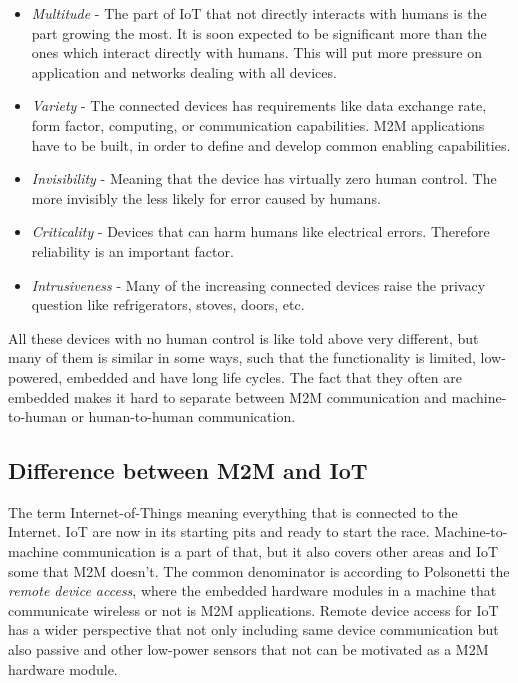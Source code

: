 \begin{itemize}
	\item \textit{Multitude} - The part of IoT that not directly interacts with humans is the part growing the most. It is soon expected to be significant more than the ones which interact directly with humans. This will put more pressure on application and networks dealing with all devices.
	\item \textit{Variety} - The connected devices has requirements like data exchange rate, form factor, computing, or communication capabilities. M2M applications have to be built, in order to define and develop common enabling capabilities.
	\item \textit{Invisibility} -  Meaning that the device has virtually zero human control. The more invisibly the less likely for error caused by humans. 
	\item \textit{Criticality} - Devices that can harm humans like electrical errors. Therefore reliability is an important factor. 
	\item \textit{Intrusiveness} - Many of the increasing connected devices raise the privacy question like refrigerators, stoves, doors, etc.
\end{itemize}
All these devices with no human control is like told above very different, but many of them is similar in some ways, such that the functionality is limited, low-powered, embedded and have long life cycles. The fact that they often are embedded makes it hard to separate between M2M communication and machine-to-human or human-to-human communication.
\cite[p.~2-4]{m2mComm}

\subsection{Difference between M2M and IoT}
The term Internet-of-Things meaning everything that is connected to the Internet. IoT are now in its starting pits and ready to start the race. Machine-to-machine communication is a part of that, but it also covers other areas and IoT some that M2M doesn't. 
The common denominator is according to Polsonetti the \textit{remote device access}, where the embedded hardware modules in a machine that communicate wireless or not is M2M applications. Remote device access for IoT has a wider perspective that not only including same device communication but also passive and other low-power sensors that not can be motivated as a M2M hardware module.
\cite[]{cpM2MIoT}

